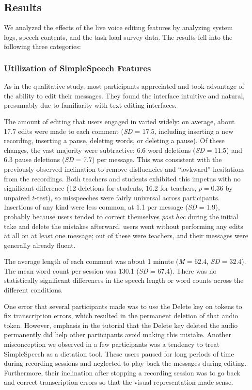 \subsection{Results}
We analyzed the effects of the live voice editing features by analyzing system logs, speech contents, and the task load survey data. The results fell into the following three categories:

\subsubsection{Utilization of SimpleSpeech Features}
As in the qualitative study, most participants appreciated and took advantage of the ability to edit their messages. They found the interface intuitive and natural, presumably due to familiarity with text-editing interfaces. 

The amount of editing that users engaged in varied widely: on average, about 17.7 edits were made to each comment (\textit{SD} = 17.5, including inserting a new recording, inserting a pause, deleting words, or deleting a pause). 
Of these changes, the vast majority were subtractive: 6.6 word deletions (\textit{SD} = 11.5) and 6.3 pause deletions (\textit{SD} = 7.7) per message.
This was consistent with the previously-observed inclination to remove disfluencies and ``awkward'' hesitations from the recordings.
Both teachers and students exhibited this impetus with no significant difference (12 deletions for students, 16.2 for teachers, $p=0.36$ by unpaired $t$-test), so misspeeches were fairly universal across participants.
Insertions of any kind were less common, at 1.1 per message (\textit{SD} = 1.9), probably because users tended to correct themselves \emph{post hoc} during the initial take and delete the mistakes afterward.
 users went without performing any edits at all on at least one message;  out of these were teachers, and their messages were generally already fluent.

The average length of each comment was about 1 minute (\textit{M} = 62.4, \textit{SD} = 32.4). The mean word count per session was 130.1 (\textit{SD} = 67.4). There was no statistically significant differences in the speech length or word counts across the different conditions.

One error that several participants made was to use the Delete key on tokens to fix transcription errors, which resulted in the permanent deletion of that audio token. 
However, emphasis in the tutorial that the Delete key deleted the audio permanently did help other participants avoid making this mistake.
Another misconception we observed in a few participants was a tendency to treat SimpleSpeech as a dictation tool. 
These users paused for long periods of time during recording sessions and neglected to play back the messages during editing. 
Furthermore, their inclination after stopping a recording session was to go back and correct transcription errors so that the visual representation made sense.

